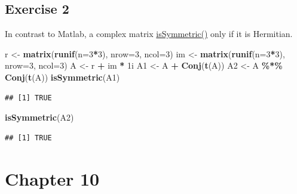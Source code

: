 \documentclass[
]{book}
\newenvironment{Shaded}{\begin{snugshade}}{\end{snugshade}}
\newcommand{\DataTypeTok}[1]{\textcolor[rgb]{0.13,0.29,0.53}{#1}}
\newcommand{\DecValTok}[1]{\textcolor[rgb]{0.00,0.00,0.81}{#1}}
\newcommand{\KeywordTok}[1]{\textcolor[rgb]{0.13,0.29,0.53}{\textbf{#1}}}
\newcommand{\NormalTok}[1]{#1}
\newcommand{\OperatorTok}[1]{\textcolor[rgb]{0.81,0.36,0.00}{\textbf{#1}}}
\newcommand{\StringTok}[1]{\textcolor[rgb]{0.31,0.60,0.02}{#1}}
\begin{document}
\hypertarget{exercise-2-5}{%
\subsection*{Exercise 2}\label{exercise-2-5}}

In contrast to Matlab, a complex matrix
\href{https://stat.ethz.ch/R-manual/R-devel/library/base/html/isSymmetric.html}{isSymmetric()} only if it is Hermitian.

\begin{Shaded}
\begin{Highlighting}[]
\NormalTok{r \textless{}{-}}\StringTok{ }\KeywordTok{matrix}\NormalTok{(}\KeywordTok{runif}\NormalTok{(}\DataTypeTok{n=}\DecValTok{3}\OperatorTok{*}\DecValTok{3}\NormalTok{), }\DataTypeTok{nrow=}\DecValTok{3}\NormalTok{, }\DataTypeTok{ncol=}\DecValTok{3}\NormalTok{)}
\NormalTok{im \textless{}{-}}\StringTok{ }\KeywordTok{matrix}\NormalTok{(}\KeywordTok{runif}\NormalTok{(}\DataTypeTok{n=}\DecValTok{3}\OperatorTok{*}\DecValTok{3}\NormalTok{), }\DataTypeTok{nrow=}\DecValTok{3}\NormalTok{, }\DataTypeTok{ncol=}\DecValTok{3}\NormalTok{)}
\NormalTok{A \textless{}{-}}\StringTok{ }\NormalTok{r }\OperatorTok{+}\StringTok{ }\NormalTok{im }\OperatorTok{*}\StringTok{ }\NormalTok{1i}
\NormalTok{A1 \textless{}{-}}\StringTok{ }\NormalTok{A }\OperatorTok{+}\StringTok{ }\KeywordTok{Conj}\NormalTok{(}\KeywordTok{t}\NormalTok{(A))}
\NormalTok{A2 \textless{}{-}}\StringTok{ }\NormalTok{A }\OperatorTok{\%*\%}\StringTok{ }\KeywordTok{Conj}\NormalTok{(}\KeywordTok{t}\NormalTok{(A))}
\KeywordTok{isSymmetric}\NormalTok{(A1)}
\end{Highlighting}
\end{Shaded}

\begin{verbatim}
## [1] TRUE
\end{verbatim}

\begin{Shaded}
\begin{Highlighting}[]
\KeywordTok{isSymmetric}\NormalTok{(A2)}
\end{Highlighting}
\end{Shaded}

\begin{verbatim}
## [1] TRUE
\end{verbatim}

\hypertarget{chapter-10-1}{%
\section*{Chapter 10}\label{chapter-10-1}}
\end{document}
